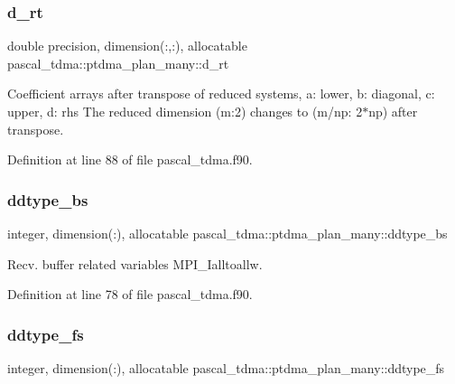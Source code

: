 \subsubsection{\texorpdfstring{d\_rt}{d\_rt}}
{\footnotesize\ttfamily double precision, dimension(\+:,\+:), allocatable pascal\+\_\+tdma\+::ptdma\+\_\+plan\+\_\+many\+::d\+\_\+rt}



Coefficient arrays after transpose of reduced systems, a\+: lower, b\+: diagonal, c\+: upper, d\+: rhs The reduced dimension (m\+:2) changes to (m/np\+: 2$\ast$np) after transpose. 



Definition at line 88 of file pascal\+\_\+tdma.\+f90.

\mbox{\label{structpascal__tdma_1_1ptdma__plan__many_a54ddb10078b443daf47204cdcd8e7f8f}} 
\subsubsection{\texorpdfstring{ddtype\_bs}{ddtype\_bs}}
{\footnotesize\ttfamily integer, dimension(\+:), allocatable pascal\+\_\+tdma\+::ptdma\+\_\+plan\+\_\+many\+::ddtype\+\_\+bs}



Recv. buffer related variables M\+P\+I\+\_\+\+Ialltoallw. 



Definition at line 78 of file pascal\+\_\+tdma.\+f90.

\mbox{\label{structpascal__tdma_1_1ptdma__plan__many_ad95f6ed58387dd66baecf53ed5fab7e8}} 
\subsubsection{\texorpdfstring{ddtype\_fs}{ddtype\_fs}}
{\footnotesize\ttfamily integer, dimension(\+:), allocatable pascal\+\_\+tdma\+::ptdma\+\_\+plan\+\_\+many\+::ddtype\+\_\+fs}



